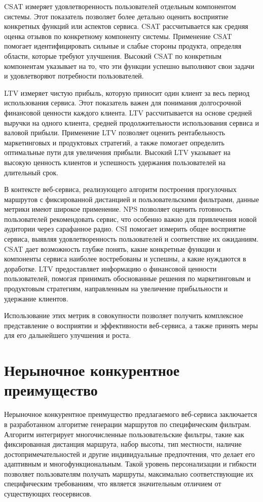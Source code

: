 CSAT измеряет удовлетворенность пользователей отдельным компонентом системы. Этот показатель позволяет более детально оценить восприятие конкретных функций или аспектов сервиса. CSAT рассчитывается как средняя оценка отзывов по конкретному компоненту системы. Применение CSAT помогает идентифицировать сильные и слабые стороны продукта, определяя области, которые требуют улучшения. Высокий CSAT по конкретным компонентам указывает на то, что эти функции успешно выполняют свои задачи и удовлетворяют потребности пользователей.

LTV измеряет чистую прибыль, которую приносит один клиент за весь период использования сервиса. Этот показатель важен для понимания долгосрочной финансовой ценности каждого клиента. LTV рассчитывается на основе средней выручки на одного клиента, средней продолжительности использования сервиса и валовой прибыли. Применение LTV позволяет оценить рентабельность маркетинговых и продуктовых стратегий, а также помогает определить оптимальные пути для увеличения прибыли. Высокий LTV указывает на высокую ценность клиентов и успешность удержания пользователей на длительный срок.

В контексте веб-сервиса, реализующего алгоритм построения прогулочных маршрутов с фиксированной дистанцией и пользовательскими фильтрами, данные метрики имеют широкое применение. NPS позволяет оценить готовность пользователей рекомендовать сервис, что особенно важно для привлечения новой аудитории через сарафанное радио. CSI помогает измерить общее восприятие сервиса, выявляя удовлетворенность пользователей и соответствие их ожиданиям. CSAT дает возможность глубже понять, какие конкретные функции и компоненты сервиса наиболее востребованы и успешны, а какие нуждаются в доработке. LTV предоставляет информацию о финансовой ценности пользователей, помогая принимать обоснованные решения по маркетинговым и продуктовым стратегиям, направленным на увеличение прибыльности и удержание клиентов.

Использование этих метрик в совокупности позволяет получить комплексное представление о восприятии и эффективности веб-сервиса, а также принять меры для его дальнейшего улучшения и роста.

\section{Нерыночное конкурентное преимущество}

Нерыночное конкурентное преимущество предлагаемого веб-сервиса заключается в разработанном алгоритме генерации маршрутов по специфическим фильтрам. Алгоритм интегрирует многочисленные пользовательские фильтры, такие как фиксированная дистанция маршрута, набор высоты, тип местности, наличие достопримечательностей и другие индивидуальные предпочтения, что делает его адаптивным и многофункциональным. Такой уровень персонализации и гибкости позволяет пользователям получать маршруты, максимально соответствующие их специфическим требованиям, что является значительным отличием от существующих геосервисов.

%





